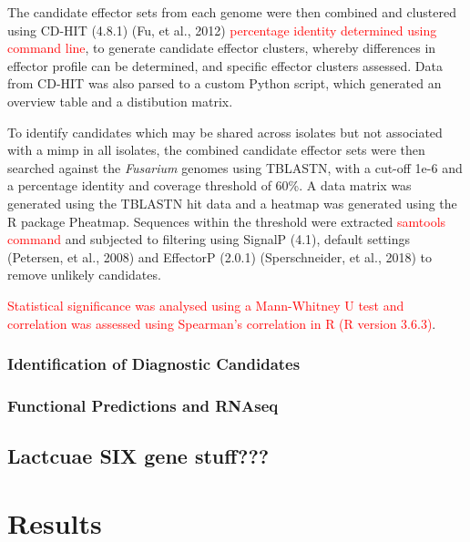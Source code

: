 The candidate effector sets from each genome were then combined and clustered using CD-HIT (4.8.1) (Fu, et al., 2012) \textcolor{red}{percentage identity determined using command line}, to generate candidate effector clusters, whereby differences in effector profile can be determined, and specific effector clusters assessed. Data from CD-HIT was also parsed to a custom Python script, which generated an overview table and a distibution matrix.

To identify candidates which may be shared across isolates but not associated with a \ac{mimp} in all isolates, the combined candidate effector sets were then searched against the \textit{Fusarium} genomes using TBLASTN, with a cut-off 1e-6 and a percentage identity and coverage threshold of 60\%. A data matrix was generated using the TBLASTN hit data and a heatmap was generated using the R package Pheatmap. Sequences within the threshold were extracted \textcolor{red}{samtools command} and subjected to filtering using SignalP (4.1), default settings (Petersen, et al., 2008) and EffectorP (2.0.1) (Sperschneider, et al., 2018) to remove unlikely candidates. 

\textcolor{red}{Statistical significance was analysed using a Mann-Whitney U test and correlation was assessed using Spearman’s correlation in R (R version 3.6.3)}.

\subsubsection{Identification of Diagnostic Candidates}

\subsubsection{Functional Predictions and RNAseq}

\subsection{Lactcuae SIX gene stuff???}

\newpage
\section{Results}





